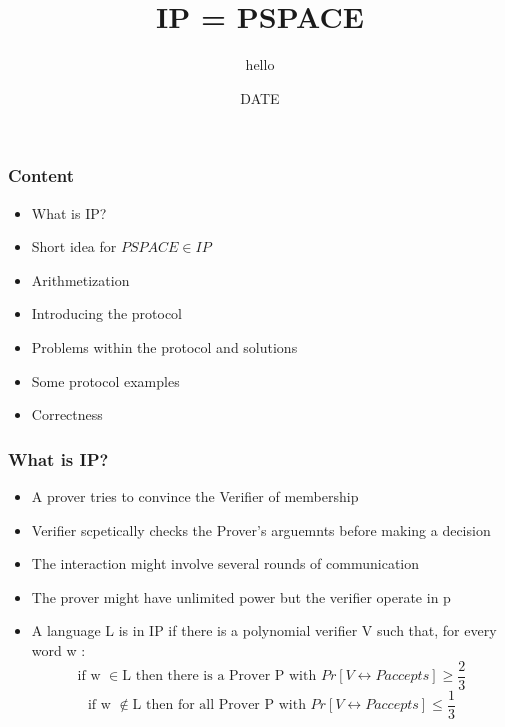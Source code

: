 \documentclass[hyperref={pdfpagelabels=false},t,10pt]{beamer}
\title{IP = PSPACE}
\author[© author]{hello}
\institute{Technische Universit\"at Dresden}
\date{DATE}
\begin{document}
\addtocounter{framenumber}{-1}
\maketitle
\begin{frame}
  \frametitle{Content}
  \begin{itemize}
    \item What is IP?
    \item Short idea for $PSPACE \in IP$
    \item Arithmetization
    \item Introducing the protocol 
    \item Problems within the protocol and solutions
    \item Some protocol examples
    \item Correctness
  \end{itemize}
\end{frame}

\begin{frame}
  \frametitle{What is IP?}
  \begin{itemize}
    \item A prover tries to convince the Verifier of membership
    \item Verifier scpetically checks the Prover's arguemnts before making a decision
    \item The interaction might involve several rounds of communication
    \item The prover might have unlimited power but the verifier operate in p
    \item A language L is in IP if there is a polynomial verifier V such that, for every word w : 
    $$\mbox{if w } \in \mbox{L then there is a Prover P with }Pr[V \leftrightarrow P accepts] \geq \frac{2}{3}$$
    $$\mbox{if w } \notin \mbox{L then for all  Prover P with }Pr[V \leftrightarrow P accepts] \leq \frac{1}{3}$$
    
  \end{itemize}
\end{frame}
\end{document}
